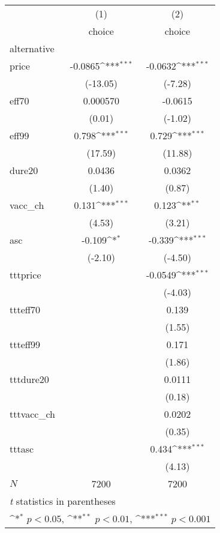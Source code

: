 {
\def\sym#1{\ifmmode^{#1}\else\(^{#1}\)\fi}
\begin{tabular}{l*{2}{c}}
\hline\hline
            &\multicolumn{1}{c}{(1)}&\multicolumn{1}{c}{(2)}\\
            &\multicolumn{1}{c}{choice}&\multicolumn{1}{c}{choice}\\
\hline
alternative &                     &                     \\
price       &     -0.0865\sym{***}&     -0.0632\sym{***}\\
            &    (-13.05)         &     (-7.28)         \\
[1em]
eff70       &    0.000570         &     -0.0615         \\
            &      (0.01)         &     (-1.02)         \\
[1em]
eff99       &       0.798\sym{***}&       0.729\sym{***}\\
            &     (17.59)         &     (11.88)         \\
[1em]
dure20      &      0.0436         &      0.0362         \\
            &      (1.40)         &      (0.87)         \\
[1em]
vacc\_ch     &       0.131\sym{***}&       0.123\sym{**} \\
            &      (4.53)         &      (3.21)         \\
[1em]
asc         &      -0.109\sym{*}  &      -0.339\sym{***}\\
            &     (-2.10)         &     (-4.50)         \\
[1em]
tttprice    &                     &     -0.0549\sym{***}\\
            &                     &     (-4.03)         \\
[1em]
ttteff70    &                     &       0.139         \\
            &                     &      (1.55)         \\
[1em]
ttteff99    &                     &       0.171         \\
            &                     &      (1.86)         \\
[1em]
tttdure20   &                     &      0.0111         \\
            &                     &      (0.18)         \\
[1em]
tttvacc\_ch  &                     &      0.0202         \\
            &                     &      (0.35)         \\
[1em]
tttasc      &                     &       0.434\sym{***}\\
            &                     &      (4.13)         \\
\hline
\(N\)       &        7200         &        7200         \\
\hline\hline
\multicolumn{3}{l}{\footnotesize \textit{t} statistics in parentheses}\\
\multicolumn{3}{l}{\footnotesize \sym{*} \(p<0.05\), \sym{**} \(p<0.01\), \sym{***} \(p<0.001\)}\\
\end{tabular}
}

